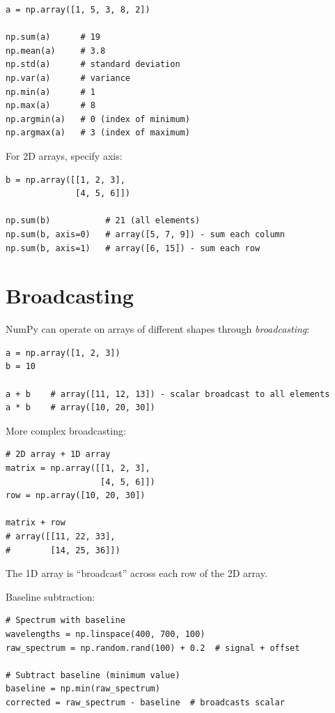 \begin{lstlisting}
a = np.array([1, 5, 3, 8, 2])

np.sum(a)      # 19
np.mean(a)     # 3.8
np.std(a)      # standard deviation
np.var(a)      # variance
np.min(a)      # 1
np.max(a)      # 8
np.argmin(a)   # 0 (index of minimum)
np.argmax(a)   # 3 (index of maximum)
\end{lstlisting}

For 2D arrays, specify axis:

\begin{lstlisting}
b = np.array([[1, 2, 3],
              [4, 5, 6]])

np.sum(b)           # 21 (all elements)
np.sum(b, axis=0)   # array([5, 7, 9]) - sum each column
np.sum(b, axis=1)   # array([6, 15]) - sum each row
\end{lstlisting}

\section{Broadcasting}
\label{sec:broadcasting}

NumPy can operate on arrays of different shapes through \emph{broadcasting}:

\begin{lstlisting}
a = np.array([1, 2, 3])
b = 10

a + b    # array([11, 12, 13]) - scalar broadcast to all elements
a * b    # array([10, 20, 30])
\end{lstlisting}

More complex broadcasting:

\begin{lstlisting}
# 2D array + 1D array
matrix = np.array([[1, 2, 3],
                   [4, 5, 6]])
row = np.array([10, 20, 30])

matrix + row
# array([[11, 22, 33],
#        [14, 25, 36]])
\end{lstlisting}

The 1D array is ``broadcast'' across each row of the 2D array.

\begin{labexample}
Baseline subtraction:

\begin{lstlisting}
# Spectrum with baseline
wavelengths = np.linspace(400, 700, 100)
raw_spectrum = np.random.rand(100) + 0.2  # signal + offset

# Subtract baseline (minimum value)
baseline = np.min(raw_spectrum)
corrected = raw_spectrum - baseline  # broadcasts scalar
\end{lstlisting}
\end{labexample}

